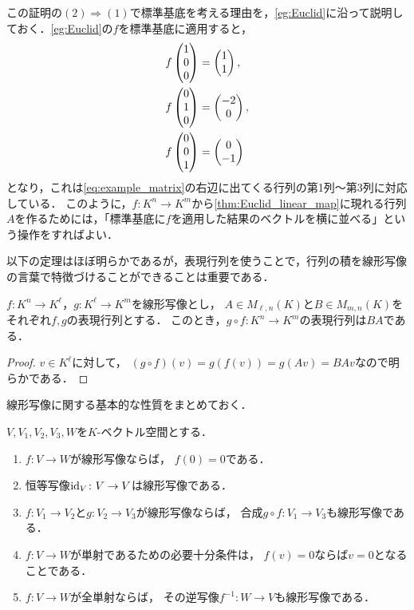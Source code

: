 \begin{remark}
    この証明の$(2) \Rightarrow (1)$で標準基底を考える理由を，\cref{eg:Euclid}に沿って説明しておく．\cref{eg:Euclid}の$f$を標準基底に適用すると，
    \[
        \begin{aligned}
            f\begin{pmatrix} 1 \\ 0 \\ 0 \end{pmatrix} &= \begin{pmatrix} 1 \\ 1 \end{pmatrix}, \\
            f\begin{pmatrix} 0 \\ 1 \\ 0 \end{pmatrix} &= \begin{pmatrix} -2 \\ 0 \end{pmatrix}, \\
            f\begin{pmatrix} 0 \\ 0 \\ 1 \end{pmatrix} &= \begin{pmatrix} 0 \\ -1 \end{pmatrix}
        \end{aligned}
    \]
    となり，これは\eqref{eq:example_matrix}の右辺に出てくる行列の第1列〜第3列に対応している．
    このように，$f\colon K^n \to K^m$から\cref{thm:Euclid_linear_map}に現れる行列$A$を作るためには，「標準基底に$f$を適用した結果のベクトルを横に並べる」という操作をすればよい．
\end{remark}
以下の定理はほぼ明らかであるが，表現行列を使うことで，行列の積を線形写像の言葉で特徴づけることができることは重要である．
\begin{prop}
    $f \colon K^n \to K^\ell$，$g \colon K^\ell \to K^m$を線形写像とし，
    $A \in M_{\ell,n}(K)$と$B \in M_{m,n}(K)$をそれぞれ$f,g$の表現行列とする．
    このとき，$g \circ f\colon K^n \to K^m$の表現行列は$BA$である．
\end{prop}
\begin{proof}
    $v \in K^\ell$に対して，
    $(g \circ f)(v) = g(f(v)) = g(Av) = BAv$なので明らかである．
\end{proof}
線形写像に関する基本的な性質をまとめておく．
\begin{prop}\label{prop:linear_map_properties}
    $V,V_1,V_2,V_3,W$を$K$-ベクトル空間とする．
    \begin{enumerate}
        \item $f\colon V \to W$が線形写像ならば，
        $f(0) = 0$である．
        \item 恒等写像$\mathrm{id}_V \colon V \to V$は線形写像である．
        \item $f\colon V_1 \to V_2$と$g \colon V_2 \to V_3$が線形写像ならば，
        合成$g \circ f \colon V_1 \to V_3$も線形写像である．
        \item $f \colon V \to W$が単射であるための必要十分条件は，
        $f(v)=0$ならば$v = 0$となることである．
        \item $f \colon V \to W$が全単射ならば，
        その逆写像$f^{-1}\colon W \to V$も線形写像である．
    \end{enumerate}
\end{prop}
